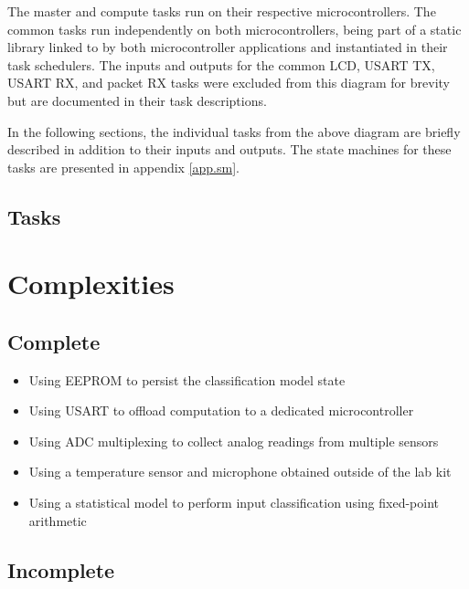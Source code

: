 \documentclass{article}
\begin{document}
The master and compute tasks run on their respective microcontrollers.
The common tasks run independently on both microcontrollers, being part
of a static library linked to by both microcontroller applications and
instantiated in their task schedulers.  The inputs and outputs for the
common LCD, USART TX, USART RX, and packet RX tasks were excluded from
this diagram for brevity but are documented in their task descriptions.

In the following sections, the individual tasks from the above diagram
are briefly described in addition to their inputs and outputs.  The
state machines for these tasks are presented in appendix \ref{app.sm}.

\subsection{Tasks}

\section{Complexities}

\subsection{Complete}

\begin{itemize}

  \item Using EEPROM to persist the classification model state

  \item Using USART to offload computation to a dedicated
    microcontroller

  \item Using ADC multiplexing to collect analog readings from multiple
    sensors

  \item Using a temperature sensor and microphone obtained outside of
    the lab kit

  \item Using a statistical model to perform input classification using
    fixed-point arithmetic

\end{itemize}

\subsection{Incomplete}
\end{document}

